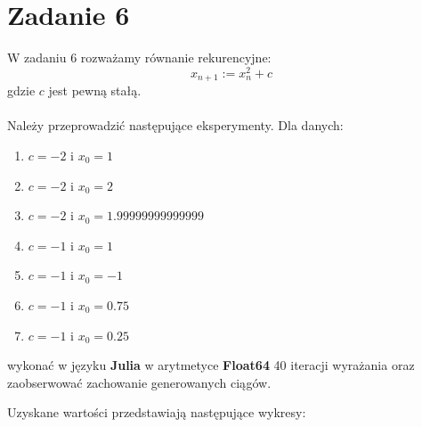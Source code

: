 \documentclass[12pt]{article}
\begin{document}
\section{Zadanie 6}
W zadaniu 6 rozważamy równanie rekurencyjne:
\begin{equation*}
	x_{n+1} := x_n^2 + c
\end{equation*} 
gdzie $c$ jest pewną stałą.
\\
\\
\noindent Należy przeprowadzić następujące eksperymenty. Dla danych: 
\begin{enumerate}
	\item{$c = -2$ i $x_0 = 1$}
	\item{$c = -2$ i $x_0 = 2$}
	\item{$c = -2$ i $x_0 = 1.99999999999999$}
	\item{$c = -1$ i $x_0 = 1$}
	\item{$c = -1$ i $x_0 = -1$}
	\item{$c = -1$ i $x_0 = 0.75$}
	\item{$c = -1$ i $x_0 = 0.25$}
\end{enumerate}
wykonać w języku \textbf{Julia} w arytmetyce \textbf{Float64} 40 iteracji wyrażania oraz zaobserwować zachowanie generowanych ciągów.

Uzyskane wartości przedstawiają następujące wykresy:
\end{document}
